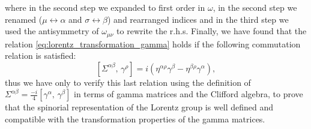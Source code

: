 where in the second step we expanded to first order in \(\omega\), in the second step we renamed (\(\mu \leftrightarrow \alpha\) and \(\sigma \leftrightarrow \beta\)) and rearranged indices and in the third step we used the antisymmetry of \(\omega_{\mu \nu}\) to rewrite the r.h.s. Finally, we have found that the relation \eqref{eq:lorentz_transformation_gamma} holds if the following commutation relation is satisfied:
\begin{equation}
    \left[ \Sigma^{\alpha \beta},\, \gamma^\rho \right] = i \left( \eta^{\alpha \rho} \gamma^{\beta} - \eta^{\beta \rho} \gamma^{\alpha} \right),
    \label{eq:commutation_Sigma_gamma}
\end{equation}
thus we have only to verify this last relation using the definition of \(\Sigma^{\alpha \beta} = \frac{-i}{4} [\gamma^{\alpha},\, \gamma^{\beta}]\) in terms of gamma matrices and the Clifford algebra, to prove that the spinorial representation of the Lorentz group is well defined and compatible with the transformation properties of the gamma matrices.

